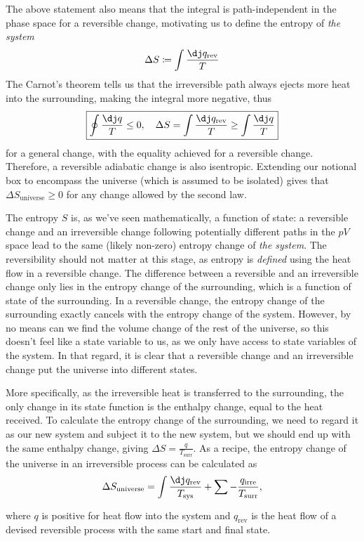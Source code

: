 \documentclass{article}
\theoremstyle{nonumberplain}
\begin{document}
The above statement also means that the integral is path-independent in the phase space for a reversible change, motivating us to define the entropy of \textit{the system}
\[
    \Delta S \coloneqq \int \frac{\dj q_{\mathrm{rev} }}{T}
\]
The Carnot's theorem tells us that the irreversible path always ejects more heat into the surrounding, making the integral more negative, thus
\[
    \boxed{\oint \frac{\dj q}{T} \leq 0, \quad 
    \Delta S = \int \frac{\dj q_{\mathrm{rev} }}{T} \geq  \int \frac{\dj q}{T}}
\]
for a general change, with the equality achieved for a reversible change. Therefore, a reversible adiabatic change is also isentropic. Extending our notional box to encompass the universe (which is assumed to be isolated) gives that \(\Delta S_{\mathrm{universe}} \geq 0\) for any change allowed by the second law. 

The entropy $S$ is, as we've seen mathematically, a function of state: a reversible change and an irreversible change following potentially different paths in the $pV$ space lead to the same (likely non-zero) entropy change of \textit{the system}. The reversibility should not matter at this stage, as entropy is \textit{defined} using the heat flow in a reversible change. The difference between a reversible and an irreversible change only lies in the entropy change of the surrounding, which is a function of state of the surrounding. In a reversible change, the entropy change of the surrounding exactly cancels with the entropy change of the system. However, by no means can we find the volume change of the rest of the universe, so this doesn't feel like a state variable to us, as we only have access to state variables of the system. In that regard, it is clear that a reversible change and an irreversible change put the universe into different states. 

More specifically, as the irreversible heat is transferred to the surrounding, the only change in its state function is the enthalpy change, equal to the heat received. To calculate the entropy change of the surrounding, we need to regard it as our new system and subject it to the new system, but we should end up with the same enthalpy change, giving $\Delta S = \frac{q}{T_{\mathrm{surr} }}. $ As a recipe, the entropy change of the universe in an irreversible process can be calculated as
\[
    \Delta S_{\mathrm{universe} } = \int \frac{\dj q_{\mathrm{rev} }}{T_{\mathrm{sys} }} + \sum_{}^{} - \frac{q_{\mathrm{irre} }}{T_{\mathrm{surr} }}, 
\]
where $q$ is positive for heat flow into the system and $q_{\mathrm{rev} }$ is the heat flow of a devised reversible process with the same start and final state. 
\end{document}
